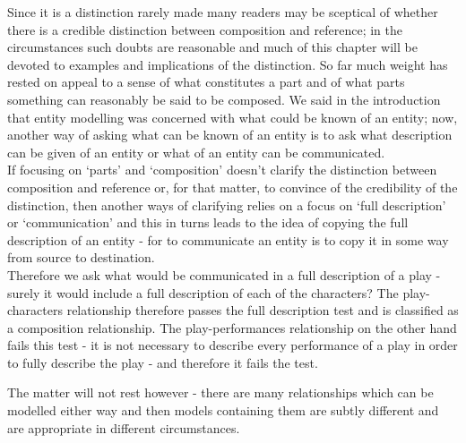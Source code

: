 \noindent Since it is a distinction rarely made many readers may be sceptical of whether there is a credible distinction between composition and reference; in the circumstances such doubts are reasonable and much of this chapter will be devoted to examples and implications of the distinction. So far much weight has rested on appeal to a sense of what constitutes a part and of what parts something can reasonably be said to be composed. We said in the introduction that entity modelling was concerned with what could be known of an entity; now, another way of asking what can be known of an entity is to ask what description can be given of an entity or what of an entity can be communicated. \\

\noindent If focusing on `parts' and `composition' doesn't clarify the distinction between composition and reference or, for that matter, to convince of the credibility of the distinction, then  another ways of clarifying relies on a focus on `full description' or `communication' and this in turns leads to the idea of copying the full description of an entity - for to communicate an entity is to copy it in some way from source to destination.\\

\noindent Therefore we ask what would be communicated in a full description of a play - surely it would include a full description of each of the characters? The play-characters relationship therefore passes the full description test and is classified as a composition relationship. The play-performances relationship on the other hand fails this test - it is not necessary to describe every performance of a play in order to fully describe the play - and therefore it fails the test.

\noindent The matter will not rest however - there are many relationships which can be modelled either way and then models containing them are subtly different and are appropriate in different circumstances. 


